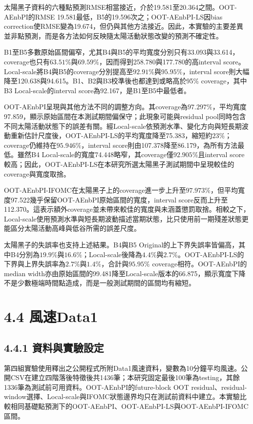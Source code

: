 太陽黑子資料的六種點預測RMSE相當接近，介於19.581至20.364之間。OOT-AEnbPI的RMSE 19.581最低，B5的19.596次之；OOT-AEnbPI-LS因bias correction使RMSE變為19.674，但仍與其他方法接近。因此，本實驗的主要差異並非點預測，而是各方法如何反映隨太陽活動狀態改變的預測不確定性。

B1至B5多數原始區間偏窄，尤其B4與B5的平均寬度分別只有33.093與33.614，coverage也只有$63.51\%$與$69.59\%$，因而得到258.780與177.780的高interval score。Local-scale將B4與B5的coverage分別提高至$92.91\%$與$95.95\%$，interval score則大幅降至120.638與94.615。B1、B2與B3校準後也都達到或略高於95\% coverage，其中B3 Local-scale的interval score為92.167，是B1至B5中最低者。

OOT-AEnbPI呈現與其他方法不同的調整方向。其coverage為$97.297\%$，平均寬度97.859，顯示原始區間在本測試期間偏保守；此現象可能與residual pool同時包含不同太陽活動狀態下的誤差有關。經Local-scale依預測水準、變化方向與短長期波動重新估計尺度後，OOT-AEnbPI-LS的平均寬度降至75.383，縮短約$23\%$；coverage仍維持在$95.946\%$，interval score則由107.378降至86.179，為所有方法最低。雖然B4 Local-scale的寬度74.448略窄，其coverage僅$92.905\%$且interval score較高；因此，OOT-AEnbPI-LS在本研究所選太陽黑子測試期間中呈現較佳的coverage與寬度取捨。

OOT-AEnbPI-IFOMC在太陽黑子上的coverage進一步上升至$97.973\%$，但平均寬度97.522幾乎保留OOT-AEnbPI原始區間的寬度，interval score反而上升至112.370。這表示額外coverage並未帶來較佳的寬度與未涵蓋懲罰取捨。相較之下，Local-scale使用預測水準與短長期波動描述當期狀態，比只使用前一期殘差狀態更能區分太陽活動高峰與低谷所需的誤差尺度。

太陽黑子的失誤率也支持上述結果。B4與B5 Original的上下界失誤率皆偏高，其中B4分別為$19.9\%$與$16.6\%$；Local-scale後降為$4.4\%$與$2.7\%$。OOT-AEnbPI-LS的下界與上界失誤率為$2.7\%$與$1.4\%$，合計與$95.95\%$ coverage相符。OOT-AEnbPI的median width亦由原始區間的99.481降至Local-scale版本的66.875，顯示寬度下降不是少數極端時間點造成，而是一般測試期間的區間均有縮短。

\section*{4.4 風速Data1}

\subsection*{4.4.1 資料與實驗設定}

第四組實驗使用\cite{dingmeng2020}釋出之公開程式所附Data1風速資料，變數為10分鐘平均風速。公開CSV在建立四階落後特徵後共1436筆；本研究固定最後100筆為testing，其餘1336筆為測試前可用資料。OOT-AEnbPI的future-block OOT residual、residual-window選擇、Local-scale與IFOMC狀態邊界均只在測試前資料中建立。本實驗比較相同基礎點預測下的OOT-AEnbPI、OOT-AEnbPI-LS與OOT-AEnbPI-IFOMC區間。

